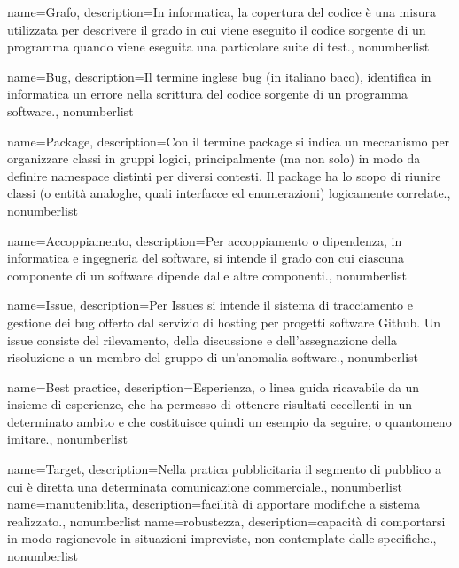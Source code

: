 {
	name={Grafo},
	description={In informatica, la copertura del codice è una misura utilizzata per descrivere il grado in cui viene eseguito il codice sorgente di un programma quando viene eseguita una particolare suite di test.}, 
	nonumberlist 
}

{
	name={Bug},
	description={Il termine inglese bug (in italiano baco), identifica in informatica un errore nella scrittura del codice sorgente di un programma software.}, 
	nonumberlist 
}

{
	name={Package},
	description={Con il termine package si indica un meccanismo per organizzare classi in gruppi logici, principalmente (ma non solo) in modo da definire namespace distinti per diversi contesti. Il package ha lo scopo di riunire classi (o entità analoghe, quali interfacce ed enumerazioni) logicamente correlate.}, 
	nonumberlist 
}

{
	name={Accoppiamento},
	description={Per accoppiamento o dipendenza, in informatica e ingegneria del software, si intende il grado con cui ciascuna componente di un software dipende dalle altre componenti.}, 
	nonumberlist 
}

{
	name={Issue},
	description={Per Issues si intende il sistema di tracciamento e gestione dei bug offerto dal servizio di hosting per progetti software Github. Un issue consiste del rilevamento, della discussione e dell'assegnazione della risoluzione a un membro del gruppo di un'anomalia software.}, 
	nonumberlist 
}

{
	name={Best practice},
	description={Esperienza, o linea guida ricavabile da un insieme di esperienze, che ha permesso di ottenere risultati eccellenti in un determinato ambito e che costituisce quindi un esempio da seguire, o quantomeno imitare.}, 
	nonumberlist 
}

{
	name={Target},
	description={Nella pratica pubblicitaria il segmento di pubblico a cui è diretta una determinata comunicazione commerciale.}, 
	nonumberlist 
}
{
	name={manutenibilita},
	description={facilità di apportare modifiche a sistema realizzato.}, 
	nonumberlist 
}
{
	name={robustezza},
	description={capacità di comportarsi in modo ragionevole in situazioni impreviste, non contemplate dalle specifiche.}, 
	nonumberlist 
}


